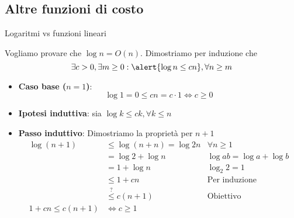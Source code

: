 \subsection{Altre funzioni di costo}

\begin{frame}[shrink]{Logaritmi vs funzioni lineari}

\begin{myboxtitle}
Vogliamo provare che \alert{$\log n = O(n)$}. Dimostriamo per induzione che\\[-6pt]
\[
\exists c>0, \exists m \geq 0: \alert{\log n \leq cn}, \forall n \geq m
\]	
\end{myboxtitle}
%
\begin{overprint}
  \begin{itemize}
  \item \textbf{Caso base ($n=1$)}: 
     \[
       \log 1 = 0 \leq cn = c \cdot 1 \Leftrightarrow c \geq 0
     \]
  \end{itemize}
  \begin{itemize}
  \item \textbf{Ipotesi induttiva}: sia \alert{$\log k \leq ck, \forall k \leq n$}
  \item \textbf{Passo induttivo}: Dimostriamo la proprietà per $n+1$
    \begin{align*}
	  \log (n+1) &\leq \log{(n+n)} = \log 2n & \forall n \geq 1 \\
	  &= \log 2 + \log n & \log ab = \log a + \log b\\
	  &= 1+ \log n & \log_2 2 = 1\\
	  &\leq 1 + cn & \text{Per induzione}\\
      &\stackrel{?}{\leq} c(n+1) & \text{Obiettivo} \\
	1 + cn \leq c(n+1) &\Leftrightarrow c \geq 1
    \end{align*}
  \end{itemize}
\end{overprint}
\end{frame}

